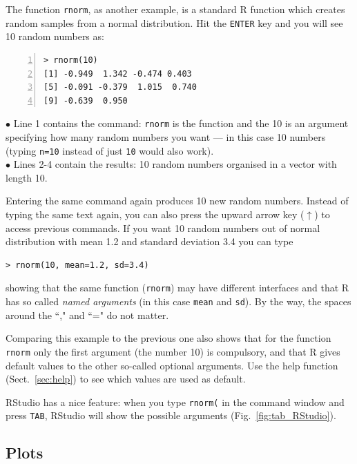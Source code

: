 \documentclass[a4paper,11pt,twocolumn,tablecaptionabove]{scrartcl}
\makeatletter
\let\SF@@footnote\footnote
\def\footnote{\ifx\protect\@typeset@protect
 \expandafter\SF@@footnote
 \else
 \expandafter\SF@gobble@opt
 \fi
}
\edef\SF@gobble@opt{\noexpand\protect
 \expandafter\noexpand\csname SF@gobble@opt \endcsname}
\makeatother
\begin{document}
The function \texttt{rnorm}, as another example, is a standard R function which creates random samples from a normal distribution.  Hit the \texttt{ENTER} key and you will see 10 random numbers as:

\begin{Verbatim}[frame=single,numbers=left,gobble=0, xleftmargin=0.35cm, numbersep=0.1cm]
> rnorm(10)
[1] -0.949  1.342 -0.474 0.403 
[5] -0.091 -0.379  1.015  0.740 
[9] -0.639  0.950
\end{Verbatim}

\noindent $\bullet$ Line 1 contains the command: \texttt{rnorm} is the function and the 10 is an argument specifying how many random numbers you want --- in this case 10 numbers (typing \texttt{n=10} instead of just \texttt{10} would also work).\\
\noindent $\bullet$  Lines 2-4 contain the results: 10 random numbers organised in a vector with length 10.

Entering the same command again produces 10 new random numbers. Instead of typing the same text again, you can also press the upward arrow key ($\uparrow$) to access previous commands.  If you want 10 random numbers out of normal distribution with mean 1.2 and standard deviation 3.4 you can type 
\begin{Verbatim}[frame=single,gobble=0]
> rnorm(10, mean=1.2, sd=3.4)
\end{Verbatim}
showing that the same function (\texttt{rnorm}) may have different interfaces and that R has so called \emph{named arguments}  (in this case \texttt{mean} and \texttt{sd}). By the way, the spaces around the ``," and ``=" do not matter.

Comparing this example to the previous one also shows that for the function \texttt{rnorm} only the first argument (the number 10) is compulsory, and that R gives default values to the other so-called optional arguments.\footnote{Use the help function (Sect.~\ref{sec:help}) to see which values are used as default.} 

RStudio has a nice feature: when you type \verb!rnorm(! in the command window and press \texttt{TAB}, RStudio will show the possible arguments (Fig.~\ref{fig:tab_RStudio}).

\subsection{Plots}
\end{document}
